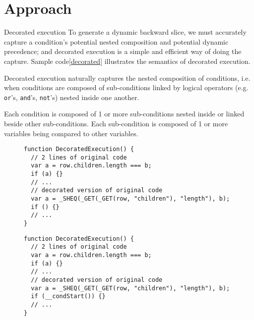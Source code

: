 \section{Approach}


Decorated execution 
To generate a dynamic backward slice, we must accurately capture a condition's potential nested composition and potential dynamic precedence; and decorated execution is a simple and efficient way of doing the capture.  
Sample code\ref{decorated} illustrates the semantics of decorated execution. 

Decorated execution naturally captures the nested composition of conditions, i.e. when conditions are composed of sub-conditions linked by logical operators (e.g. {\tt or}'s, {\tt and}'s, {\tt not}'s) nested inside one another.



Each condition is composed of 1 or more sub-conditions nested inside or linked beside other sub-conditions.  Each sub-condition is composed of 1 or more variables being compared to other variables.  

\begin{figure}
\begin{lstlisting}[caption=Example showing how code is decorated for logging execution and using the trace to construct a dynamic backward slice,label=decorated]  
function DecoratedExecution() {
  // 2 lines of original code
  var a = row.children.length === b; 
  if (a) {}
  // ...
  // decorated version of original code
  var a = _SHEQ(_GET(_GET(row, "children"), "length"), b);
  if () {}
  // ...
}
\end{lstlisting}
\end{figure}
\begin{figure}
\begin{lstlisting}[caption=Example showing how code is decorated for logging execution and using the trace to construct a dynamic backward slice,label=sheq]  
function DecoratedExecution() {
  // 2 lines of original code
  var a = row.children.length === b; 
  if (a) {}
  // ...
  // decorated version of original code
  var a = _SHEQ(_GET(_GET(row, "children"), "length"), b);
  if (__condStart()) {}
  // ...
}
\end{lstlisting}
\end{figure}


